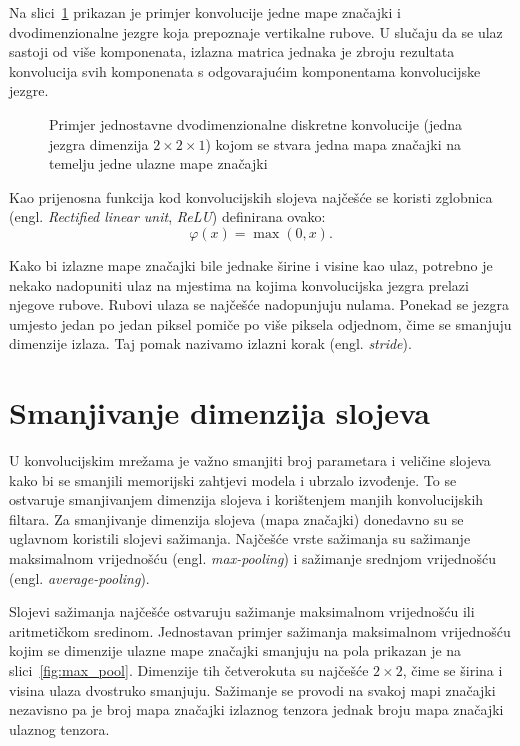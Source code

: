 \documentclass[utf8, seminar, numeric, lmodern]{feri}
\newcommand{\ilustracija}[1]{}
\begin{document}
Na slici~\ref{fig:konv} prikazan je primjer konvolucije jedne mape značajki i dvodimenzionalne jezgre koja prepoznaje vertikalne rubove. U slučaju da se ulaz sastoji od više komponenata, izlazna matrica jednaka je zbroju rezultata konvolucija svih komponenata s odgovarajućim komponentama konvolucijske jezgre.

\begin{figure}[htbp] \centering
	\ilustracija{konv}
	\caption{Primjer jednostavne dvodimenzionalne diskretne konvolucije (jedna jezgra dimenzija $2\times 2\times 1$) kojom se stvara jedna mapa značajki na temelju jedne ulazne mape značajki}
	\label{fig:konv}
\end{figure}

Kao prijenosna funkcija kod konvolucijskih slojeva najčešće se koristi zglobnica (engl. \emph{Rectified linear unit}, \emph{ReLU}) definirana ovako:
\begin{equation}
\varphi(x) = \max(0, x).
\end{equation}

Kako bi izlazne mape značajki bile jednake širine i visine kao ulaz, potrebno je nekako nadopuniti ulaz na mjestima na kojima konvolucijska jezgra prelazi njegove rubove. Rubovi ulaza se najčešće nadopunjuju nulama. Ponekad se jezgra umjesto jedan po jedan piksel pomiče po više piksela odjednom, čime se smanjuju dimenzije izlaza. Taj pomak nazivamo izlazni korak (engl. \emph{stride}).


\section{Smanjivanje dimenzija slojeva} \label{sec:smanjivanje-dimenzija}

U konvolucijskim mrežama je važno smanjiti broj parametara i veličine slojeva kako bi se smanjili memorijski zahtjevi modela i ubrzalo izvođenje. To se ostvaruje smanjivanjem dimenzija slojeva i korištenjem manjih konvolucijskih filtara. Za smanjivanje dimenzija slojeva (mapa značajki) donedavno su se uglavnom koristili slojevi sažimanja. Najčešće vrste sažimanja su sažimanje maksimalnom vrijednošću (engl. \emph{max-pooling}) i sažimanje srednjom vrijednošću (engl. \emph{average-pooling}). 

Slojevi sažimanja najčešće ostvaruju sažimanje maksimalnom vrijednošću ili aritmetičkom sredinom. Jednostavan primjer sažimanja maksimalnom vrijednošću kojim se dimenzije ulazne mape značajki smanjuju na pola prikazan je na slici~\ref{fig:max_pool}. Dimenzije tih četverokuta su najčešće $2\times2$, čime se širina i visina ulaza dvostruko smanjuju. Sažimanje se provodi na svakoj mapi značajki nezavisno pa je broj mapa značajki izlaznog tenzora jednak broju mapa značajki ulaznog tenzora.
\end{document}
